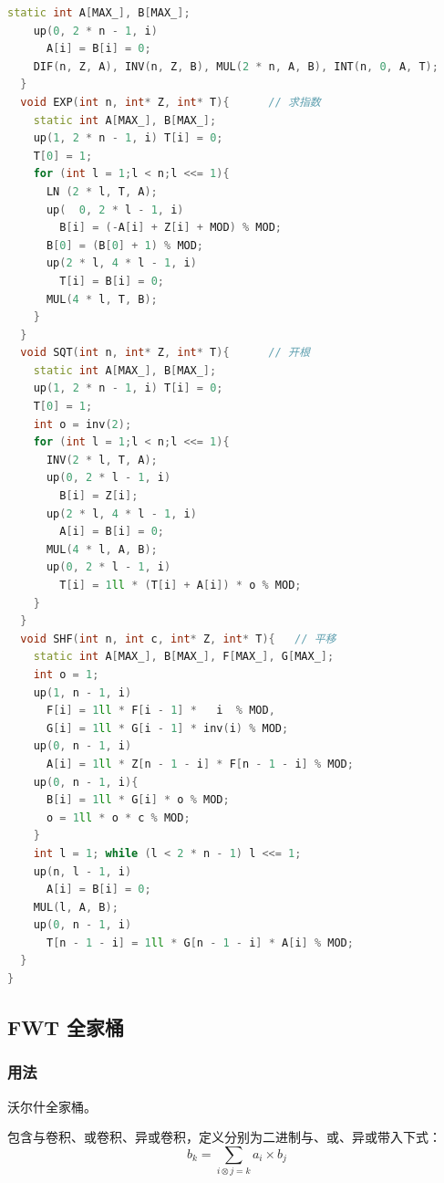 \documentclass[10pt]{ctexart}
\begin{document}
\begin{multicols}{3}
\begin{lstlisting}[language={C++}]
    static int A[MAX_], B[MAX_];
    up(0, 2 * n - 1, i)
      A[i] = B[i] = 0;
    DIF(n, Z, A), INV(n, Z, B), MUL(2 * n, A, B), INT(n, 0, A, T);
  }
  void EXP(int n, int* Z, int* T){      // 求指数
    static int A[MAX_], B[MAX_];
    up(1, 2 * n - 1, i) T[i] = 0;
    T[0] = 1;
    for (int l = 1;l < n;l <<= 1){
      LN (2 * l, T, A);
      up(  0, 2 * l - 1, i)
        B[i] = (-A[i] + Z[i] + MOD) % MOD;
      B[0] = (B[0] + 1) % MOD;
      up(2 * l, 4 * l - 1, i)
        T[i] = B[i] = 0;
      MUL(4 * l, T, B);
    }
  }
  void SQT(int n, int* Z, int* T){      // 开根
    static int A[MAX_], B[MAX_];
    up(1, 2 * n - 1, i) T[i] = 0;
    T[0] = 1;
    int o = inv(2);
    for (int l = 1;l < n;l <<= 1){
      INV(2 * l, T, A);
      up(0, 2 * l - 1, i)
        B[i] = Z[i];
      up(2 * l, 4 * l - 1, i)
        A[i] = B[i] = 0;
      MUL(4 * l, A, B);
      up(0, 2 * l - 1, i)
        T[i] = 1ll * (T[i] + A[i]) * o % MOD;
    }
  }
  void SHF(int n, int c, int* Z, int* T){   // 平移
    static int A[MAX_], B[MAX_], F[MAX_], G[MAX_];
    int o = 1;
    up(1, n - 1, i)
      F[i] = 1ll * F[i - 1] *   i  % MOD,
      G[i] = 1ll * G[i - 1] * inv(i) % MOD;
    up(0, n - 1, i)
      A[i] = 1ll * Z[n - 1 - i] * F[n - 1 - i] % MOD;
    up(0, n - 1, i){
      B[i] = 1ll * G[i] * o % MOD;
      o = 1ll * o * c % MOD;
    }
    int l = 1; while (l < 2 * n - 1) l <<= 1;
    up(n, l - 1, i)
      A[i] = B[i] = 0; 
    MUL(l, A, B);
    up(0, n - 1, i)
      T[n - 1 - i] = 1ll * G[n - 1 - i] * A[i] % MOD;
  }
}
\end{lstlisting}

    \subsection{FWT 全家桶}\label{fwt-ux5168ux5bb6ux6876}

    \subsubsection{用法}\label{ux7528ux6cd5-18}

    沃尔什全家桶。

    包含与卷积、或卷积、异或卷积，定义分别为二进制与、或、异或带入下式：\[b_k = \sum_{i \otimes j = k} a_i \times b_j\]


\end{multicols}
\end{document}
